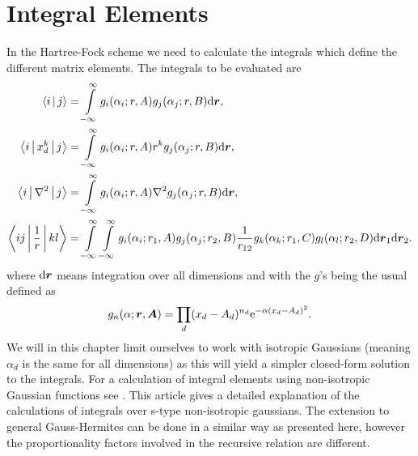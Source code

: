 \section{Integral Elements}
    In the Hartree-Fock scheme we need to calculate the integrals which define
    the different matrix elements. The integrals to be evaluated are
        \begin{equation}
            \begin{aligned}
                \Braket{i|j} &= \int\limits^{\infty}_{-\infty} g_i(\alpha_i;r,A)g_j(\alpha_j;r,B) \mathrm{d}
                \boldsymbol{{r}}, \\
                \Braket{i|x^k_d|j} &= \int\limits^{\infty}_{-\infty} g_i(\alpha_i;r,A) r^k
                g_j(\alpha_j;r,B) \mathrm{d} \boldsymbol{{r}}, \\
                \Braket{i|\nabla^2|j} &= \int\limits^{\infty}_{-\infty} g_i(\alpha_i;r,A)\nabla^2
                g_j(\alpha_j;r,B) \mathrm{d} \boldsymbol{{r}}, \\
                \Braket{ij|\frac{1}{r}|kl} &= \int\limits^{\infty}_{-\infty}\int\limits^{\infty}_{-\infty}
                g_i(\alpha_i;r_1,A)g_j(\alpha_j;r_2,B) \frac{1}{r_{12}}
                g_k(\alpha_k;r_1,C)g_l(\alpha_l;r_2,D) \mathrm{d} \boldsymbol{{r}}_1 \mathrm{d}
                \boldsymbol{{r}}_2.
            \end{aligned}
        \end{equation}
    where $\mathrm{d}\boldsymbol{{r}}$ means integration over all dimensions and with the
    $g$'s being the usual  defined as
        \begin{equation}
            g_n(\alpha;\boldsymbol{{r}},\boldsymbol{{A}}) = \prod_d (x_d-A_d)^{n_d}
            \mathrm{e}^{-\alpha (x_d-A_d)^2}.
            \label{eq:hermiteGauss2}
        \end{equation}
    We will in this chapter limit ourselves to work with isotropic Gaussians
    (meaning $\alpha_d$ is the same for all dimensions) as this will yield a
    simpler closed-form solution to the integrals. For a calculation of
    integral elements using non-isotropic Gaussian functions see
    \cite{nonIsoGauss}. This article gives a detailed explanation of the
    calculations of integrals over s-type non-isotropic gaussians. The
    extension to general Gauss-Hermites can be done in a similar way as
    presented here, however the proportionality factors involved in the
    recursive relation are different. \\

